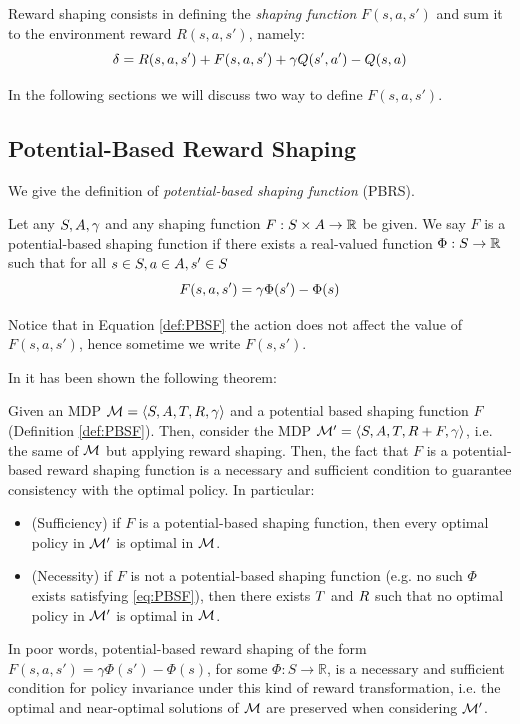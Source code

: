 Reward shaping consists in defining the \emph{shaping function} $F(s,a,s')$ and sum it to the environment reward $R(s,a,s')$, namely:
\begin{equation}\label{eq:temporal-difference-reward-shaping}
\delta = R(s,a,s') + F(s,a,s') + \gamma Q(s', a') - Q(s, a)
\end{equation}

In the following sections we will discuss two way to define $F(s,a,s')$. 

\subsection{Potential-Based Reward Shaping}\label{sect:PBRS}
We give the definition of \emph{potential-based shaping function} (PBRS).
\begin{definition}\label{def:PBSF}
	Let any $S, A, \gamma$ and any shaping function $F: S\times A\to\mathbb{R}$ be given.
	We say $F$ is a potential-based shaping function if there exists a real-valued function $\Phi: S \to \mathbb{R}$ such that for all $s\in S, a\in A, s'\in S$
	\begin{equation}\label{eq:PBSF}
	F(s,a,s') = \gamma\Phi(s') - \Phi(s)
	\end{equation}
\end{definition}
Notice that in Equation \ref{def:PBSF} the action does not affect the value of $F(s,a,s')$, hence sometime we write $F(s,s')$.

In \citep{Ng:1999:PIU:645528.657613} it has been shown the following theorem: 
\begin{theorem}\label{th:PBSF}
	Given an MDP $\mathcal{M} = \langle S, A, T, R, \gamma \rangle$ and a potential based shaping function $F$ (Definition \ref{def:PBSF}). 
	Then, consider the MDP $\mathcal{M}' = \langle S, A, T, R + F, \gamma \rangle$, i.e. the same of $\mathcal{M}$ but applying reward shaping. Then, the fact that $F$ is a potential-based reward shaping function is a necessary and sufficient condition to guarantee consistency with the optimal policy. In particular:
	\begin{itemize}
		\item (Sufficiency) if $F$ is a potential-based shaping function, then every optimal policy in $\mathcal{M}'$ is optimal in $\mathcal{M}$.
		\item (Necessity) if $F$ is not a potential-based shaping function (e.g. no such $\Phi$ exists satisfying \ref{eq:PBSF}), then there exists $T$ and $R$ such that no optimal policy in $\mathcal{M}'$ is optimal in $\mathcal{M}$.
	\end{itemize}
\end{theorem}
In poor words, potential-based reward shaping of the form $F(s, a, s') = \gamma\Phi(s') - \Phi(s)$, for some $\Phi: S \to \mathbb{R}$, is a necessary and sufficient condition for policy invariance under this kind of reward transformation, i.e. the optimal and near-optimal solutions of $\mathcal{M}$ are preserved when considering $\mathcal{M}'$.


